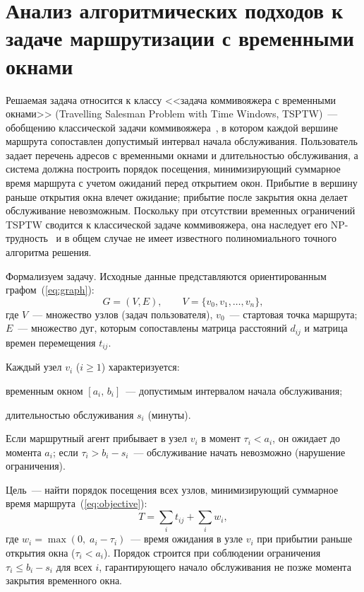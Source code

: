 \section{Анализ алгоритмических подходов к задаче маршрутизации с временными окнами}

Решаемая задача относится к классу <<задача коммивояжера с временными окнами>>
(Travelling Salesman Problem with Time Windows, TSPTW)~--- обобщению
классической задачи коммивояжера~\cite{held1962dp}, в котором каждой вершине
маршрута сопоставлен допустимый интервал начала обслуживания.
Пользователь задает перечень адресов с временными окнами и длительностью обслуживания,
а система должна построить порядок посещения, минимизирующий суммарное время маршрута
с учетом ожиданий перед открытием окон. Прибытие в вершину раньше открытия окна
влечет ожидание; прибытие после закрытия окна делает обслуживание невозможным.
Поскольку при отсутствии временных ограничений TSPTW сводится к классической задаче коммивояжера,
она наследует его NP-трудность~\cite{cormen2013algorithms,ahonenuk2010algos,skiena2018algorithm,sedgewick2014algorithms} и в общем случае
не имеет известного полиномиального точного алгоритма решения.

Формализуем задачу. Исходные данные представляются ориентированным графом~(\ref{eq:graph}):
\setlength{\abovedisplayskip}{0pt}
\setlength{\belowdisplayskip}{0pt}
\begin{equation}
  G = (V, E), \qquad V = \{v_0, v_1, \ldots, v_n\},
  \label{eq:graph}
\end{equation}
где  $V$~--- множество узлов (задач пользователя), $v_0$~--- стартовая точка маршрута;
$E$~--- множество дуг, которым сопоставлены матрица расстояний $d_{ij}$ и матрица времен перемещения $t_{ij}$.

Каждый узел $v_i$ ($i \geq 1$) характеризуется:
\begin{compactlist}
  \item временным окном $[a_i,\, b_i]$~--- допустимым интервалом начала обслуживания;
  \item длительностью обслуживания $s_i$ (минуты).
\end{compactlist}

Если маршрутный агент прибывает в узел $v_i$ в момент $\tau_i < a_i$, он ожидает
до момента $a_i$; если $\tau_i > b_i - s_i$~--- обслуживание начать невозможно
(нарушение ограничения).

Цель~--- найти порядок посещения всех узлов, минимизирующий суммарное время
маршрута~(\ref{eq:objective}):
\setlength{\abovedisplayskip}{0pt}
\setlength{\belowdisplayskip}{0pt}
\begin{equation}
  T = \sum_{i} t_{ij} + \sum_{i} w_i,
  \label{eq:objective}
\end{equation}
где $w_i = \max(0,\; a_i - \tau_i)$~--- время ожидания в узле $v_i$ при прибытии раньше открытия окна ($\tau_i < a_i$).
Порядок строится при соблюдении ограничения $\tau_i \leq b_i - s_i$ для всех $i$,
гарантирующего начало обслуживания не позже момента закрытия временного окна.

